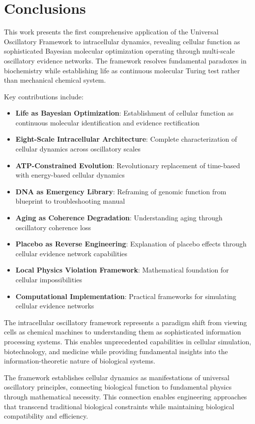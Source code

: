 \documentclass[12pt,a4paper]{article}
\begin{document}
{\section{Conclusions}

This work presents the first comprehensive application of the Universal Oscillatory Framework to intracellular dynamics, revealing cellular function as sophisticated Bayesian molecular optimization operating through multi-scale oscillatory evidence networks. The framework resolves fundamental paradoxes in biochemistry while establishing life as continuous molecular Turing test rather than mechanical chemical system.

Key contributions include:

\begin{itemize}
\item \textbf{Life as Bayesian Optimization}: Establishment of cellular function as continuous molecular identification and evidence rectification
\item \textbf{Eight-Scale Intracellular Architecture}: Complete characterization of cellular dynamics across oscillatory scales
\item \textbf{ATP-Constrained Evolution}: Revolutionary replacement of time-based with energy-based cellular dynamics
\item \textbf{DNA as Emergency Library}: Reframing of genomic function from blueprint to troubleshooting manual
\item \textbf{Aging as Coherence Degradation}: Understanding aging through oscillatory coherence loss
\item \textbf{Placebo as Reverse Engineering}: Explanation of placebo effects through cellular evidence network capabilities
\item \textbf{Local Physics Violation Framework}: Mathematical foundation for cellular impossibilities
\item \textbf{Computational Implementation}: Practical frameworks for simulating cellular evidence networks
\end{itemize}

The intracellular oscillatory framework represents a paradigm shift from viewing cells as chemical machines to understanding them as sophisticated information processing systems. This enables unprecedented capabilities in cellular simulation, biotechnology, and medicine while providing fundamental insights into the information-theoretic nature of biological systems.

The framework establishes cellular dynamics as manifestations of universal oscillatory principles, connecting biological function to fundamental physics through mathematical necessity. This connection enables engineering approaches that transcend traditional biological constraints while maintaining biological compatibility and efficiency.

}
\end{document}
